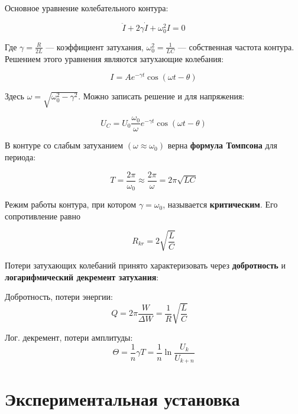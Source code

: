 \documentclass[a4paper, 14pt]{extarticle}
\begin{document}
Основное уравнение колебательного контура:

\begin{equation}\label{ddot I}
    \ddot{I} + 2\gamma\dot{I} + \omega_0^2I = 0
\end{equation}

Где ${\gamma = \frac{R}{2L}}$ --- коэффициент затухания, $ \omega_0^2 = \frac{1}{LC} $ --- собственная частота контура. Решением этого уравнения являются затухающие колебания:

\begin{equation}\label{}
I = A e^{-\gamma t} \cos (\omega t - \theta)
\end{equation}

Здесь $ \omega = \sqrt{\omega_0^2 - \gamma^2} $. Можно записать решение и для напряжения:

\begin{equation}\label{}
U_C = U_0 \frac{\omega_0}{\omega} e^{-\gamma t}\cos (\omega t - \theta)
\end{equation}

В контуре со слабым затуханием $ (\omega \approx \omega_0) $ верна \textbf{формула Томпсона} для периода: 

\begin{equation}\label{}
T = \frac{2\pi}{\omega_0} \approx \frac{2\pi}{\omega} = 2\pi\sqrt{LC}
\end{equation}

Режим работы контура, при котором $ \gamma = \omega_0 $, называется \textbf{критическим}. Его сопротивление равно 

\begin{equation}\label{}
R_{kr} = 2\sqrt{\frac{L}{C}}
\end{equation}

Потери затухающих колебаний принято характеризовать через \textbf{добротность} и \textbf{логарифмический декремент затухания}: 

Добротность, потери энергии:
\begin{equation}\label{Q}
Q = 2\pi \frac{W}{\Delta W} = \frac{1}{R} \sqrt{\frac{L}{C}} \quad 
\end{equation}

Лог. декремент, потери амплитуды:
\begin{equation}\label{theta}
\Theta = \frac{1}{n} \gamma T = \frac{1}{n} \ln \frac{U_k}{U_{k+n}}
\end{equation}

\section{Экспериментальная установка}
\end{document}
